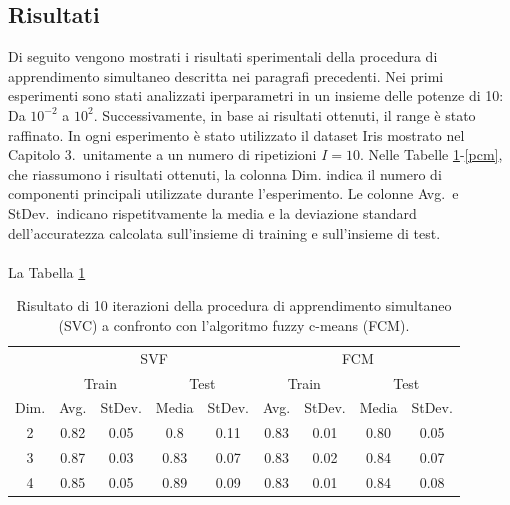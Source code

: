 \documentclass [11pt,a4paper,twoside,openright] {book}
\begin{document}
\subsection{Risultati}
Di seguito vengono mostrati i risultati sperimentali della procedura di apprendimento simultaneo descritta nei paragrafi precedenti. Nei primi esperimenti sono stati analizzati iperparametri in un insieme delle potenze di 10: Da $10^{-2}$ a $10^2$. Successivamente, in base ai risultati ottenuti, il range è stato raffinato. In ogni esperimento è stato utilizzato il dataset Iris mostrato nel Capitolo 3.\ unitamente a un numero di ripetizioni $I=10$. Nelle Tabelle \ref{wirn}-\ref{pcm}, che riassumono i risultati ottenuti, la colonna Dim. indica il numero di componenti principali utilizzate durante l'esperimento. Le colonne Avg.\ e StDev.\ indicano rispetitvamente la media e la deviazione standard dell'accuratezza calcolata sull'insieme di training e sull'insieme di test.\\\\La Tabella \ref{wirn}
\begin{table}[!t]
\caption{Risultato di 10 iterazioni della procedura di apprendimento simultaneo (SVC) a confronto con l'algoritmo fuzzy c-means (FCM)\label{wirn}.}
\begin{tabular}{|c|c|c|c|c|c|c|c|c|}
\hline
& \multicolumn{4}{|c|}{SVF} & \multicolumn{4}{|c|}{FCM}\\
\cline{2-9}
& \multicolumn{2}{|c|}{Train} & \multicolumn{2}{|c|}{Test} & \multicolumn{2}{|c|}{Train} & \multicolumn{2}{|c|}{Test}\\
\hline
Dim. & Avg. & StDev. & Media & StDev. & Avg. & StDev. & Media & StDev. \\
\hline
2 & 0.82 & 0.05 & 0.8 & 0.11 & 0.83 & 0.01 & 0.80 & 0.05 \\
3 & 0.87 & 0.03 & 0.83 & 0.07 & 0.83 & 0.02 & 0.84 & 0.07 \\
4 & 0.85 & 0.05 & 0.89 & 0.09 & 0.83 & 0.01 & 0.84 & 0.08 \\
\hline
\end{tabular}
\end{table}
\end{document}
